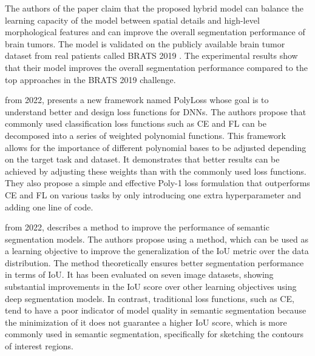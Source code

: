The authors of the paper claim that the proposed hybrid model can balance the learning capacity of the model between spatial details and high-level morphological features and can improve the overall segmentation performance of brain tumors. The model is validated on the publicly available brain tumor dataset from real patients called BRATS  2019 \cite{Menze2014-gj}. The experimental results show that their model improves the overall segmentation performance compared to the top approaches in the BRATS 2019 challenge.

 \cite{leng2022polyloss} from 2022, presents a new framework named PolyLoss whose goal is to understand better and design loss functions for \acp{DNN}. The authors propose that commonly used classification loss functions such as \ac{CE} and \ac{FL} can be decomposed into a series of weighted polynomial functions. This framework allows for the importance of different polynomial bases to be adjusted depending on the target task and dataset. It demonstrates that better results can be achieved by adjusting these weights than with the commonly used loss functions. They also propose a simple and effective Poly-1 loss formulation that outperforms \ac{CE} and \ac{FL} on various tasks by only introducing one extra hyperparameter and adding one line of code.

 \cite{Yu2022} from 2022, describes a method to improve the performance of semantic segmentation models. The authors propose using a  method, which can be used as a learning objective to improve the generalization of the IoU metric over the data distribution. The method theoretically ensures better segmentation performance in terms of \ac{IoU}. It has been evaluated on seven image datasets, showing substantial improvements in the IoU score over other learning objectives using deep segmentation models. In contrast, traditional loss functions, such as \ac{CE}, tend to have a poor indicator of model quality in semantic segmentation because the minimization of it does not guarantee a higher IoU score, which is more commonly used in semantic segmentation, specifically for sketching the contours of interest regions.

